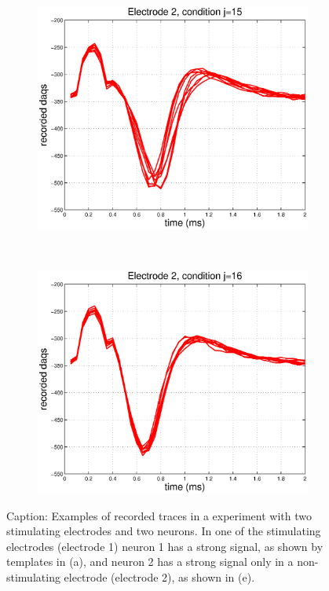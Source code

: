 \documentclass[12pt,letterpaper,fleqn]{article}
\begin{document}
\begin{figure}[ht!]
\begin{subfigure}[b]{0.23\textwidth}
                \includegraphics[width=\textwidth]{EL22.eps}
                \caption{}
                \end{subfigure}
~ \begin{subfigure}[b]{0.23\textwidth}
                \includegraphics[width=\textwidth]{EL23.eps}
                \caption{}
        \end{subfigure}
\caption{Caption: Examples of recorded traces in a experiment with two stimulating electrodes and two neurons. In one of the stimulating electrodes (electrode 1) neuron 1 has a strong signal, as shown by templates in (a), and neuron 2 has a strong signal only in a non-stimulating electrode (electrode 2), as shown in (e).
}
\end{figure}
\end{document}
